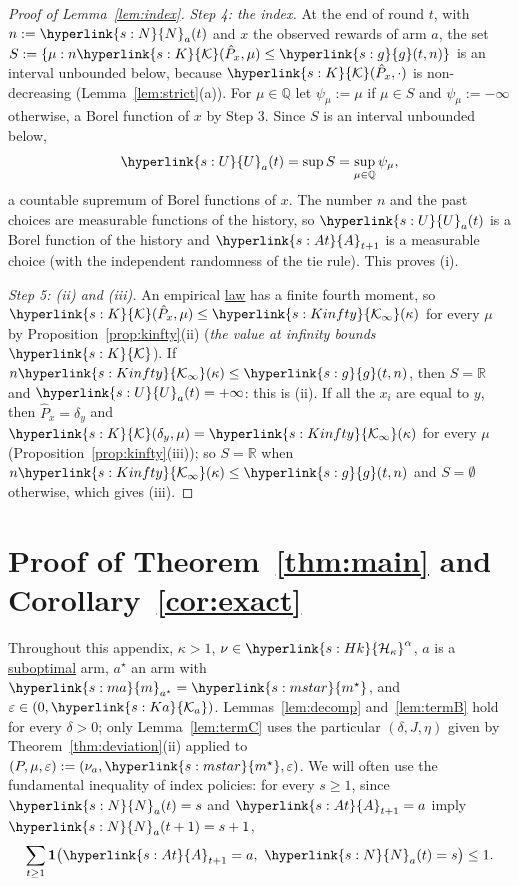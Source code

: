 \documentclass[11pt]{article}
\newcommand{\R}{\mathbb{R}}
\newcommand{\ind}{\mathbf{1}}
\newcommand{\sy}[2]{{\hyperlink{#1}{#2}}}
\newcommand{\term}[2]{\hyperlink{#1}{#2}}
\newcommand{\marm}{\sy{s:ma}{m}}
\newcommand{\mstar}{\sy{s:mstar}{m^{\star}}}
\newcommand{\Arm}{\sy{s:At}{A}}
\newcommand{\Hk}{\sy{s:Hk}{\mathcal{H}_{\kappa}}}
\newcommand{\Kc}{\sy{s:K}{\mathcal{K}}}
\newcommand{\Kinfty}{\sy{s:Kinfty}{\mathcal{K}_{\infty}}}
\newcommand{\Np}{\sy{s:N}{N}}
\newcommand{\thr}{\sy{s:g}{g}}
\newcommand{\Ix}{\sy{s:U}{U}}
\newcommand{\Ka}{\sy{s:Ka}{\mathcal{K}_{a}}}
\begin{document}
\begin{proof}[Proof of Lemma~\ref{lem:index}]
\emph{Step 4: the index.} At the end of round $t$, with $n:=\Np_a(t)$ and $x$ the observed rewards of arm $a$, the set
$S:=\{\mu:n\Kc(\hat P_x,\mu)\le\thr(t,n)\}$ is an interval unbounded below, because $\Kc(\hat P_x,\cdot)$ is non-decreasing
(Lemma~\ref{lem:strict}(a)). For $\mu\in\mathbb Q$ let $\psi_\mu:=\mu$ if $\mu\in S$ and $\psi_\mu:=-\infty$ otherwise, a Borel function of
$x$ by Step 3. Since $S$ is an interval unbounded below,
\begin{equation*}
  \Ix_a(t)=\sup S=\sup_{\mu\in\mathbb Q}\psi_\mu ,
\end{equation*}
a countable supremum of Borel functions of $x$. The number $n$ and the past choices are measurable
functions of the history, so $\Ix_a(t)$ is a Borel function of the history and $\Arm_{t+1}$ is a measurable choice
(with the independent randomness of the tie rule). This proves (i).

\emph{Step 5: (ii) and (iii).} An empirical \term{w:law}{law} has a finite fourth moment, so $\Kc(\hat P_x,\mu)\le\Kinfty(\kappa)$ for
every $\mu$ by Proposition~\ref{prop:kinfty}(ii) (\emph{the value at infinity bounds $\Kc$}). If $n\Kinfty(\kappa)\le\thr(t,n)$, then $S=\R$ and $\Ix_a(t)=+\infty$: this is
(ii). If all the $x_i$ are equal to $y$, then $\hat P_x=\delta_y$ and $\Kc(\delta_y,\mu)=\Kinfty(\kappa)$ for every $\mu$
(Proposition~\ref{prop:kinfty}(iii)); so $S=\R$ when $n\Kinfty(\kappa)\le\thr(t,n)$ and $S=\emptyset$ otherwise, which gives (iii).
\end{proof}

\section{\texorpdfstring{Proof of Theorem~\ref{thm:main} and Corollary~\ref{cor:exact}}{Proof of Theorem 6.1 and Corollary 6.2}}\label{sec:proof-main}

Throughout this appendix, $\kappa>1$, $\nu\in\Hk^\alpha$, $a$ is a \term{w:subopt}{suboptimal} arm, $a^\star$ an arm with $\marm_{a^\star}=\mstar$,
and $\varepsilon\in(0,\Ka)$. Lemmas~\ref{lem:decomp} and~\ref{lem:termB} hold for every $\delta>0$; only
Lemma~\ref{lem:termC} uses the particular $(\delta,J,\eta)$ given by Theorem~\ref{thm:deviation}(ii) applied to
$(P,\mu,\varepsilon):=(\nu_a,\mstar,\varepsilon)$. We will often use the fundamental inequality of index policies: for every
$s\ge1$, since $\Np_a(t)=s$ and $\Arm_{t+1}=a$ imply $\Np_a(t+1)=s+1$,
\begin{equation}\label{eq:fundamental}
  \sum_{t\ge1}\ind\bigl(\Arm_{t+1}=a,\ \Np_a(t)=s\bigr)\le1 .
\end{equation}
\end{document}

